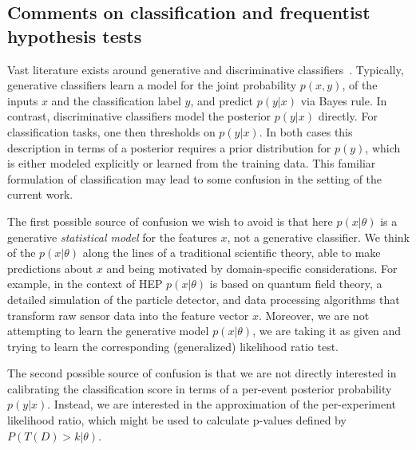 \documentclass[11pt, oneside]{article}   	%
\begin{document}
\subsection{Comments on classification and frequentist hypothesis tests}

Vast literature exists around generative and discriminative classifiers~\citep{AndrewY.Ng}. Typically, generative classifiers learn a model for the joint probability $p(x,y)$, of the inputs $x$ and the classification label $y$, and predict $p(y|x)$ via Bayes rule. In contrast, discriminative classifiers model the posterior $p(y|x)$ directly. For classification tasks, one then thresholds on $p(y|x)$. In both cases this description in terms of a posterior requires a prior distribution for $p(y)$, which is either modeled explicitly or learned from the training data. 
This familiar formulation of classification may lead to some confusion in the setting of the current work. 

The first possible source of confusion we wish to avoid is that here $p(x|\theta)$  is a generative \textit{statistical model} for the features $x$, not a generative classifier. We think of the  $p(x|\theta)$ along the lines of a traditional scientific theory, able to make predictions about $x$ and being motivated by domain-specific considerations. For example, in the context of HEP $p(x|\theta)$ is based on quantum field theory, a detailed simulation of the particle detector, and data processing algorithms that transform raw sensor data into the feature vector $x$.  
Moreover, we are not attempting to learn the generative model $p(x|\theta)$, we are taking it as given and trying to learn the corresponding (generalized) likelihood ratio test.

The second possible source of confusion is that 
we are not directly interested in calibrating the classification score in terms of a per-event posterior probability $p(y|x)$. 
Instead, we are interested in the approximation of the per-experiment likelihood ratio, which might be used to calculate p-values defined by $P(T(D) > k |\theta)$.
%

\end{document}
